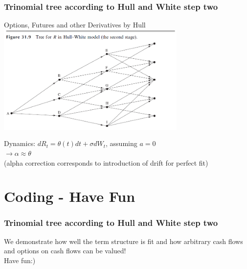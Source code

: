 \documentclass{beamer}
\begin{document}
	\begin{frame}
		\frametitle{Trinomial tree according to Hull and White step two}
		\begin{block}{Options, Futures and other Derivatives by Hull}
			\includegraphics[width=0.7\textwidth]{Trinomialbaum hull White step two}
		\end{block}
		Dynamics: $dR_t = \theta(t)dt + \sigma dW_t$, assuming $a=0$\\
		$\rightarrow \alpha \approx \theta$ \\
		(alpha correction corresponds to introduction of drift for perfect fit)
	\end{frame}
	
	\section{Coding - Have Fun}
	
	\begin{frame}
		\frametitle{Trinomial tree according to Hull and White step two} 
		We demonstrate how well the term structure is fit and how arbitrary cash flows and options on cash flows can be valued!\\
		
		Have fun:)
	\end{frame}
	
	
	
	
	
	
	
\end{document}
